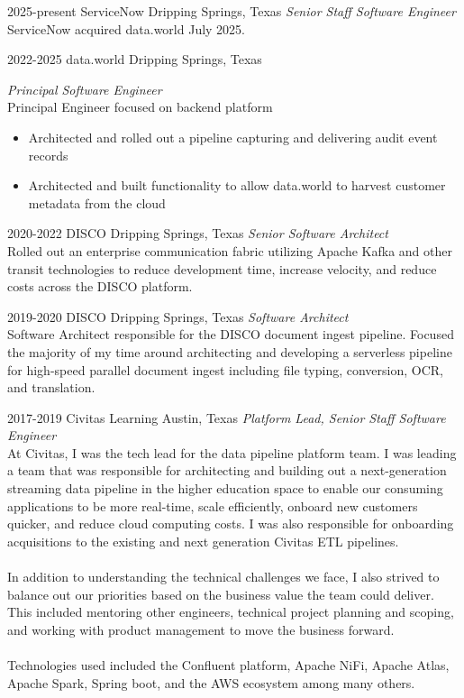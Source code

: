 \documentclass{friggeri-cv} %
\begin{document}
\begin{entrylist}
\entry
{2025-present}
{ServiceNow}
{Dripping Springs, Texas}
{\emph{Senior Staff Software Engineer} \\
ServiceNow acquired data.world July 2025.
}
\end{entrylist}
\begin{entrylist}
\entry
{2022-2025}
{data.world}
{Dripping Springs, Texas}
{\emph{Principal Software Engineer} \\
Principal Engineer focused on backend platform
\begin{itemize}
\item Architected and rolled out a pipeline capturing and delivering audit event records
\item Architected and built functionality to allow data.world to harvest customer metadata from the cloud 
\end{itemize}
}
\end{entrylist}
\begin{entrylist}
\entry
{2020-2022}
{DISCO}
{Dripping Springs, Texas}
{\emph{Senior Software Architect} \\
Rolled out an enterprise communication fabric utilizing Apache Kafka and other transit technologies to reduce development time, increase velocity, and reduce costs across the DISCO platform.}
\end{entrylist}
\begin{entrylist}
\entry
{2019-2020}
{DISCO}
{Dripping Springs, Texas}
{\emph{Software Architect} \\
Software Architect responsible for the DISCO document ingest pipeline. Focused the majority of my time around architecting and developing a serverless pipeline for high-speed parallel document ingest including file typing, conversion, OCR, and translation.}
\end{entrylist}
\begin{entrylist}
\entry
{2017-2019}
{Civitas Learning}
{Austin, Texas}
{\emph{Platform Lead, Senior Staff Software Engineer} \\
At Civitas, I was the tech lead for the data pipeline platform team. I was leading a team that was responsible for architecting and building out a next-generation streaming data pipeline in the higher education space to enable our consuming applications to be more real-time, scale efficiently, onboard new customers quicker, and reduce cloud computing costs. I was also responsible for onboarding acquisitions to the existing and next generation Civitas ETL pipelines. \\ \\
In addition to understanding the technical challenges we face, I also strived to balance out our priorities based on the business value the team could deliver. This included mentoring other engineers, technical project planning and scoping, and working with product management to move the business forward. \\ \\
Technologies used included the Confluent platform, Apache NiFi, Apache Atlas, Apache Spark, Spring boot, and the AWS ecosystem among many others.}
\end{entrylist}
\end{document}
